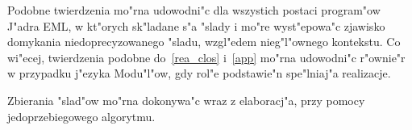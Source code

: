 Podobne twierdzenia mo"rna udowodni"c dla wszystich postaci program"ow J"adra EML,
w kt"orych sk"ladane s"a "slady i mo"re wyst"epowa"c zjawisko domykania 
niedoprecyzowanego "sladu, wzgl"edem nieg"l"ownego kontekstu.
Co wi"ecej, twierdzenia podobne do~\ref{rea_clos} i~\ref{app} mo"rna udowodni"c
r"ownie"r w przypadku j"ezyka Modu"l"ow, gdy rol"e podstawie"n spe"lniaj"a realizacje.

\begin{cor}
\label{single_pass}
Zbierania "slad"ow mo"rna dokonywa"c wraz z elaboracj"a, przy pomocy jedoprzebiegowego algorytmu.
\end{cor}

